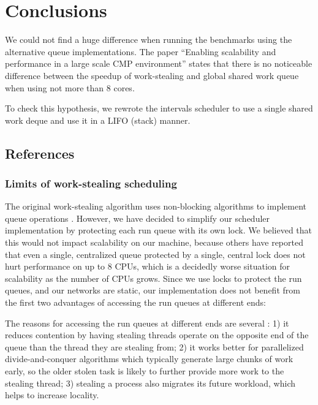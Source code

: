 
\chapter{Conclusions}
\label{chap:queues-conclusions}


We could not find a huge difference when running the benchmarks using
the alternative queue implementations. The paper ``Enabling
scalability and performance in a large scale CMP environment''
\cite{Saha2007} states that there is no noticeable difference between
the speedup of work-stealing and global shared work queue when using
not more than 8 cores.

To check this hypothesis, we rewrote the intervals scheduler to use a
single shared work deque and use it in a LIFO (stack) manner.


\section{References}

\subsection{Limits of work-stealing scheduling \cite{Vrba2009}}

The original work-stealing algorithm uses non-blocking algorithms to
implement queue operations \cite{Arora2001}. However, we have decided
to simplify our scheduler implementation by protecting each run queue
with its own lock. We believed that this would not impact scalability
on our machine, because others \cite{Saha2007} have reported that even
a single, centralized queue protected by a single, central lock does
not hurt performance on up to 8 CPUs, which is a decidedly worse
situation for scalability as the number of CPUs grows. Since we use
locks to protect the run queues, and our networks are static, our
implementation does not benefit from the first two advantages of
accessing the run queues at different ends:

The reasons for accessing the run queues at different ends are several
\cite{Frigo1998}: 1) it reduces contention by having stealing threads
operate on the opposite end of the queue than the thread they are
stealing from; 2) it works better for parallelized divide-and-conquer
algorithms which typically generate large chunks of work early, so the
older stolen task is likely to further provide more work to the
stealing thread; 3) stealing a process also migrates its future
workload, which helps to increase locality.

